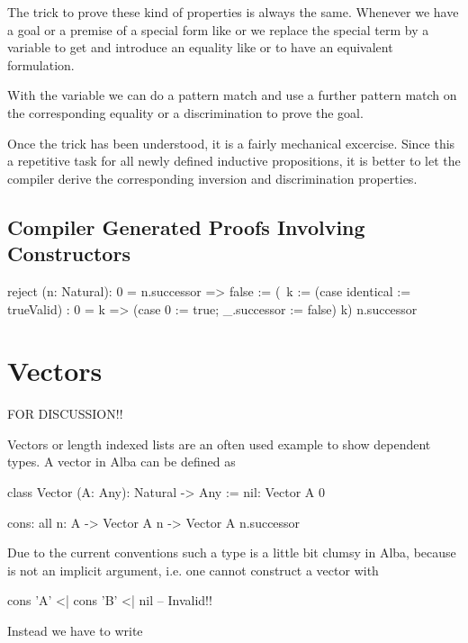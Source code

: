 The trick to prove these kind of properties is always the same. Whenever we have
a goal or a premise of a special form like  or
 we replace the special term by a variable to get
 and introduce an equality like  or  to have an equivalent formulation.

With the variable we can do a pattern match and use a further pattern match on
the corresponding equality or a discrimination to prove the goal.

Once the trick has been understood, it is a fairly mechanical excercise. Since
this a repetitive task for all newly defined inductive propositions, it is
better to let the compiler derive the corresponding inversion and discrimination
properties.



\subsection{Compiler Generated Proofs Involving Constructors}



\begin{alba}
    reject (n: Natural): 0 = n.successor => false
    :=
        (\ k :=
            (case identical := trueValid)
            : 0 = k
              =>
              (case 0 := true; _.successor := false) k)
          n.successor
\end{alba}


\begin{alba}
\end{alba}





\section{Vectors}


FOR DISCUSSION!!


Vectors or length indexed lists are an often used example to show dependent
types. A vector in Alba can be defined as

\begin{alba}
    class
        Vector (A: Any): Natural -> Any
    :=
        nil: Vector A 0

        cons: all n: A -> Vector A n -> Vector A n.successor
\end{alba}

Due to the current conventions such a type is a little bit clumsy in Alba,
because  is not an implicit argument, i.e. one cannot construct a vector
with
%
\begin{alba}
    cons 'A' <| cons 'B' <| nil  -- Invalid!!
\end{alba}
%
%
Instead we have to write


